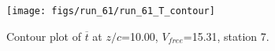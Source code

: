 \begin{figure}[H]
\centering
\texttt{[image: figs/run\_61/run\_61\_T\_contour]}
\caption{Contour plot of $\overline{t}$ at $z/c$=10.00, $V_{free}$=15.31, station 7.}
\label{fig:run_61_T_contour}
\end{figure}


